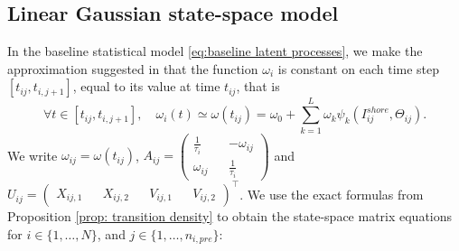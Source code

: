 \documentclass[aoas]{imsart}
\theoremstyle{definition}
\theoremstyle{remark}
\theoremstyle{remark}
\newcommand {\1}{\mathbb{1}}
\begin{document}
\subsection{Linear Gaussian state-space model}
\label{section: state space model}
In the baseline statistical model \eqref{eq:baseline latent processes}, we make the approximation suggested in \citep{michelot_varying-coefficient_2021} that the function $\omega_i$ is constant on each time step $[t_{ij},t_{i,j+1}]$, equal to its value at time $t_{ij}$, that is 
\[\forall t \in [t_{ij},t_{i,j+1}], \quad \omega_{i}(t) \simeq \omega(t_{ij})=\omega_{0}+\sum_{k=1}^{L} \omega_{k} \psi_k(I_{ij}^{shore},\Theta_{ij}).\]
We write %
$\omega_{ij}=\omega(t_{ij})$, $A_{ij}=\begin{pmatrix} 
	\frac{1}{\tau_{i}} && -\omega_{ij} \\
	\omega_{ij} && \frac{1}{\tau_{i}}
\end{pmatrix}$ and $U_{ij}=\begin{pmatrix} X_{ij,1}  && X_{ij,2} && V_{ij,1} && V_{ij,2}\end{pmatrix}^\top$. %
%
We use the exact formulas from Proposition \ref{prop: transition density} to obtain the state-space matrix equations for $i\in\{1,\ldots, N\}$, and $j\in\{1, \ldots, n_{i,pre}\}$:%
\end{document}
